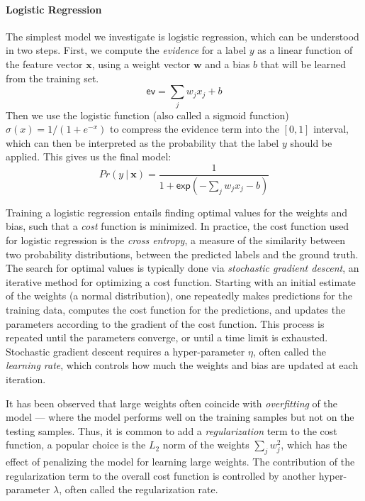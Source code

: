 \paragraph{Logistic Regression}


The simplest model we investigate is logistic regression, which can be
understood in two steps.
%
First, we compute the \emph{evidence} for a label $y$ as a linear
function of the feature vector $\mathbf{x}$, using a weight vector
$\mathbf{w}$ and a bias $b$ that will be learned from the training set.
$$
\mathsf{ev} = \sum_j w_j x_j + b
$$
Then we use the logistic function (also called a sigmoid function)
$\sigma(x) = 1 / (1 + e^{-x})$ to compress the evidence term into the
$[0,1]$ interval, which can then be interpreted as the probability that
the label $y$ should be applied.
%
This gives us the final model:
$$
Pr(y\ |\ \mathbf{x}) = \frac{1}{1 + \mathsf{exp}(-\sum_j w_j x_j - b)}
$$

Training a logistic regression entails finding optimal values for the
weights and bias, such that a \emph{cost} function is minimized.
%
In practice, the cost function used for logistic regression is the
\emph{cross entropy}, a measure of the similarity between two
probability distributions, between the predicted labels and the ground
truth.
%
The search for optimal values is typically done via \emph{stochastic
  gradient descent}, an iterative method for optimizing a cost function.
%
Starting with an initial estimate of the weights (\eg a normal
distribution), one repeatedly makes predictions for the training data,
computes the cost function for the predictions, and updates the
parameters according to the gradient of the cost function.
%
This process is repeated until the parameters converge, or until a time
limit is exhausted.
%
Stochastic gradient descent requires a hyper-parameter $\eta$, often
called the \emph{learning rate}, which controls how much the weights and
bias are updated at each iteration.

It has been observed  that large weights often coincide with
\emph{overfitting} of the model --- where the model performs well on the
training samples but not on the testing samples.
%
Thus, it is common to add a \emph{regularization} term to the cost
function, a popular choice is the $L_2$ norm of the weights $\sum_j w_j^2$,
which has the effect of penalizing the model for learning large weights.
The contribution of the regularization term to the overall cost function is
controlled by another hyper-parameter $\lambda$, often called the
regularization rate.

